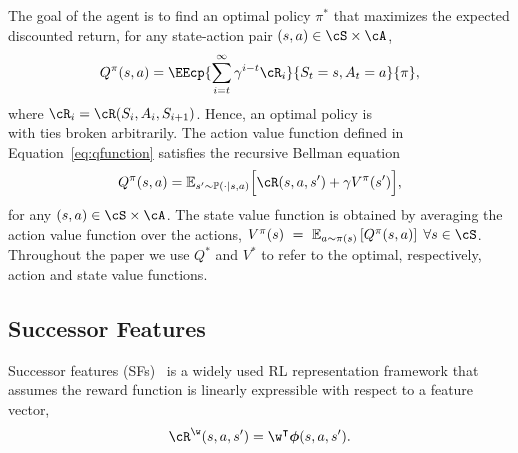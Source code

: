 The goal of the agent is to find an optimal policy $\pi^*$ that maximizes the expected discounted return, for any state-action pair ${(s,a)\in\cS\times\cA}$,
\begin{equation}
Q^\pi(s, a) = \EEcp{\sum_{i=t}^\infty \gamma^{i-t}\cR_i}{S_t=s, A_t=a}{\pi},
\label{eq:qfunction} 
\end{equation}
where $\cR_i = \cR(S_i, A_i, S_{i+1})$. Hence, an optimal policy is
\begin{equation*}
\end{equation*} with ties broken arbitrarily.
The action value function defined in Equation~\eqref{eq:qfunction} satisfies the recursive Bellman equation
\begin{equation}
     Q^\pi(s,a) = \mathbb{E}_{s'\sim\mathbb{P}(\cdot \lvert s, a)}\Big[\cR(s, a, s')+\gamma V^\pi(s')\Big],
\end{equation}
for any $(s,a)\in\cS\times\cA$. The state value function is obtained by averaging the action value function over the actions, $V^\pi(s)~=~\mathbb{E}_{a\sim\pi(s)}\left[ Q^\pi(s, a)\right]\;\forall s \in\cS$.
Throughout the paper we use $Q^*$ and $V^*$ to refer to the optimal, respectively, action and state value functions.
 
\subsection{Successor Features}

Successor features (SFs)~\citep{Dayan1993, Barreto2017} is a widely used RL representation framework that assumes the reward function is linearly expressible with respect to a feature vector,
\begin{equation}
  \cR^\w(s, a, s') = \w^\intercal\boldsymbol\phi(s, a , s').
  \label{eq:reward_sf}
\end{equation}

